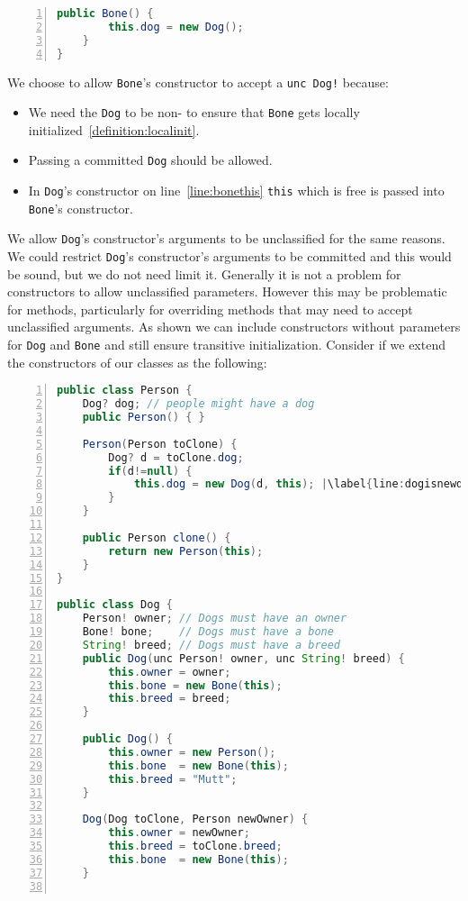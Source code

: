 \documentclass{article}
\begin{document}
\begin{example}
\begin{lstlisting}[language=Java, escapechar=|, numbers=left]
    public Bone() {
        this.dog = new Dog();
    }
}
\end{lstlisting}
  We choose to allow \texttt{Bone}'s constructor to accept a \texttt{unc Dog!} because:
  \begin{itemize}
  \item We need the \texttt{Dog} to be non-\cringe{} to ensure that \texttt{Bone} gets locally initialized~\ref{definition:localinit}.
  \item Passing a committed \texttt{Dog} should be allowed.
  \item In \texttt{Dog}'s constructor on line~\ref{line:bonethis} \texttt{this} which is free is passed into \texttt{Bone}'s constructor.
  \end{itemize}
  We allow \texttt{Dog}'s constructor's arguments to be unclassified for the same reasons.
  We could restrict \texttt{Dog}'s constructor's arguments to be committed and this would be sound, but we do not need limit it.
  Generally it is not a problem for constructors to allow unclassified parameters.
  However this may be problematic for methods, particularly for overriding methods that may need to accept unclassified arguments.
  As shown we can include constructors without parameters for \texttt{Dog} and \texttt{Bone} and still ensure transitive initialization.
  Consider if we extend the constructors of our classes as the following:
\begin{lstlisting}[language=Java, escapechar=|, numbers=left]
 public class Person {
    Dog? dog; // people might have a dog
    public Person() { }

    Person(Person toClone) {
        Dog? d = toClone.dog;
        if(d!=null) {
            this.dog = new Dog(d, this); |\label{line:dogisnewdog}|
        }
    }

    public Person clone() {
        return new Person(this);         
    }
}

public class Dog {
    Person! owner; // Dogs must have an owner
    Bone! bone;    // Dogs must have a bone
    String! breed; // Dogs must have a breed
    public Dog(unc Person! owner, unc String! breed) {
        this.owner = owner;
        this.bone = new Bone(this);
        this.breed = breed;
    }

    public Dog() {
        this.owner = new Person();
        this.bone  = new Bone(this);
        this.breed = "Mutt";
    }

    Dog(Dog toClone, Person newOwner) {
        this.owner = newOwner;
        this.breed = toClone.breed;
        this.bone  = new Bone(this);
    }


\end{lstlisting}
\end{example}
\end{document}
